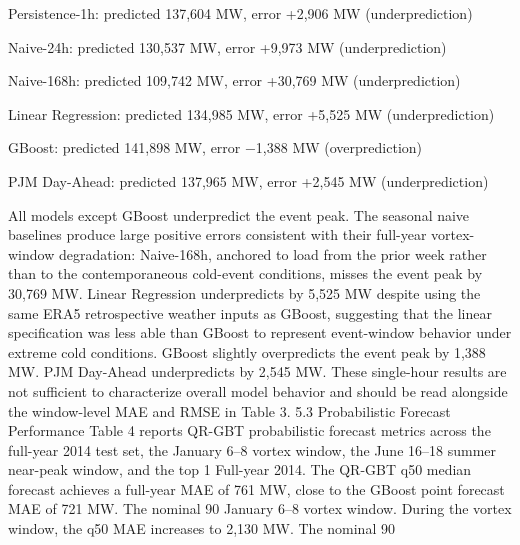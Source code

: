 Persistence-1h: predicted 137,604 MW, error +2,906 MW (underprediction)


Naive-24h: predicted 130,537 MW, error +9,973 MW (underprediction)


Naive-168h: predicted 109,742 MW, error +30,769 MW (underprediction)


Linear Regression: predicted 134,985 MW, error +5,525 MW (underprediction)


GBoost: predicted 141,898 MW, error −1,388 MW (overprediction)


PJM Day-Ahead: predicted 137,965 MW, error +2,545 MW (underprediction)


All models except GBoost underpredict the event peak. The seasonal naive baselines produce large positive errors consistent with their full-year vortex-window degradation: Naive-168h, anchored to load from the prior week rather than to the contemporaneous cold-event conditions, misses the event peak by 30,769 MW. Linear Regression underpredicts by 5,525 MW despite using the same ERA5 retrospective weather inputs as GBoost, suggesting that the linear specification was less able than GBoost to represent event-window behavior under extreme cold conditions. GBoost slightly overpredicts the event peak by 1,388 MW. PJM Day-Ahead underpredicts by 2,545 MW.
These single-hour results are not sufficient to characterize overall model behavior and should be read alongside the window-level MAE and RMSE in Table 3.
5.3 Probabilistic Forecast Performance
Table 4 reports QR-GBT probabilistic forecast metrics across the full-year 2014 test set, the January 6–8 vortex window, the June 16–18 summer near-peak window, and the top 1%
Full-year 2014. The QR-GBT q50 median forecast achieves a full-year MAE of 761 MW, close to the GBoost point forecast MAE of 721 MW. The nominal 90%
January 6–8 vortex window. During the vortex window, the q50 MAE increases to 2,130 MW. The nominal 90%
